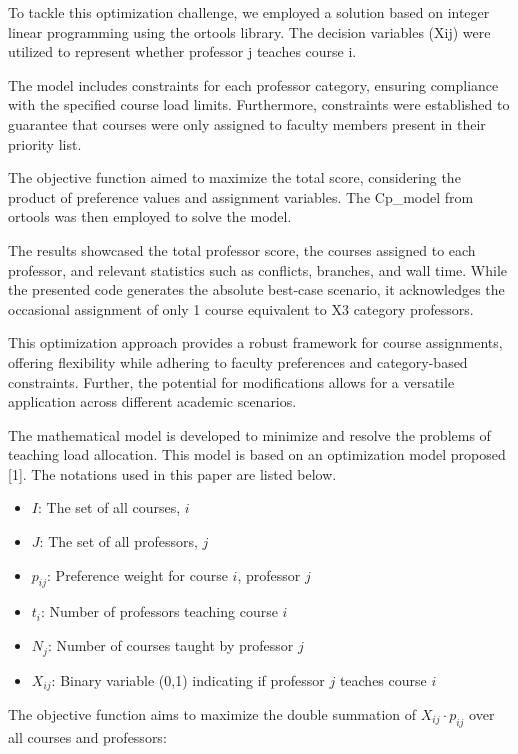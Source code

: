 \documentclass{article}
\begin{document}
	To tackle this optimization challenge, we employed a solution based on integer linear programming using the ortools library. The decision variables (Xij) were utilized to represent whether professor j teaches course i.
	
	The model includes constraints for each professor category, ensuring compliance with the specified course load limits. Furthermore, constraints were established to guarantee that courses were only assigned to faculty members present in their priority list.
	
	The objective function aimed to maximize the total score, considering the product of preference values and assignment variables. The Cp\_model from ortools was then employed to solve the model.
	
	The results showcased the total professor score, the courses assigned to each professor, and relevant statistics such as conflicts, branches, and wall time. While the presented code generates the absolute best-case scenario, it acknowledges the occasional assignment of only 1 course equivalent to X3 category professors.
	
	This optimization approach provides a robust framework for course assignments, offering flexibility while adhering to faculty preferences and category-based constraints. Further, the potential for modifications allows for a versatile application across different academic scenarios.
	
	The mathematical model is developed to minimize and resolve the problems of teaching load allocation. This model is based on an optimization model proposed [1]. The notations used in this paper are listed below.
	
	\begin{itemize}
		\item $I$: The set of all courses, $i$
		\item $J$: The set of all professors, $j$
		\item $p_{ij}$: Preference weight for course $i$, professor $j$
		\item $t_i$: Number of professors teaching course $i$
		\item $N_j$: Number of courses taught by professor $j$
		\item $X_{ij}$: Binary variable (0,1) indicating if professor $j$ teaches course $i$
	\end{itemize}
	
	The objective function aims to maximize the double summation of $X_{ij} \cdot p_{ij}$ over all courses and professors:
	
\end{document}
